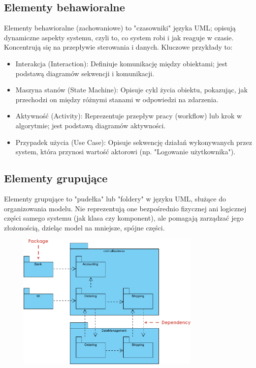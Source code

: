 \documentclass[a4paper,12pt]{article}
\begin{document}
\subsection{Elementy behawioralne}
Elementy behawioralne (zachowaniowe) to "czasowniki" języka UML; opisują dynamiczne aspekty systemu, czyli to, co system robi i jak reaguje w czasie. Koncentrują się na przepływie sterowania i danych. Kluczowe przykłady to:
\begin{itemize}
\item Interakcja (Interaction): Definiuje komunikację między obiektami; jest podstawą diagramów sekwencji i komunikacji.
\item Maszyna stanów (State Machine): Opisuje cykl życia obiektu, pokazując, jak przechodzi on między różnymi stanami w odpowiedzi na zdarzenia.
\item Aktywność (Activity): Reprezentuje przepływ pracy (workflow) lub krok w algorytmie; jest podstawą diagramów aktywności.
\item Przypadek użycia (Use Case): Opisuje sekwencję działań wykonywanych przez system, która przynosi wartość aktorowi (np. "Logowanie użytkownika").
\end{itemize}

\newpage\subsection{Elementy grupujące}
Elementy grupujące to "pudełka" lub "foldery" w języku UML, służące do organizowania modelu. Nie reprezentują one bezpośrednio fizycznej ani logicznej części samego systemu (jak klasa czy komponent), ale pomagają zarządzać jego złożonością, dzieląc model na mniejsze, spójne części.

\begin{figure}[h!]
    \centering
    \includegraphics[width=0.8\textwidth]{img/02-simple-package-diagram-example.png}
\end{figure}
\end{document}

